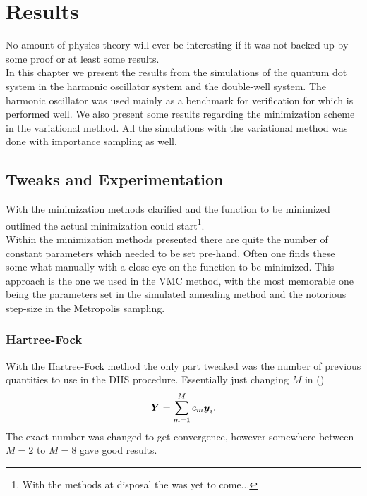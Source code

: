 \chapter{Results \label{chapter:6}}
    No amount of physics theory will ever be interesting if it was not backed
    up by some proof or at least some results. \\
    In this chapter we present the results from the simulations of the quantum
    dot system in the harmonic oscillator system and the double-well system.
    The harmonic oscillator was used mainly as a benchmark for verification for
    which is performed well. We also present some results regarding the
    minimization scheme in the variational method. All the simulations with the
    variational method was done with importance sampling as well.

\section{Tweaks and Experimentation}
    With the minimization methods clarified and the function to be minimized
    outlined the actual minimization could start\footnote{With the methods at
    disposal the  was yet to come...}. \\
    Within the minimization methods presented there are quite the number of
    constant parameters which needed to be set pre-hand. Often one finds these
    some-what manually with a close eye on the function to be minimized. This
    approach is the one we used in the VMC method, with the most memorable one
    being the parameters set in the simulated annealing method and the
    notorious step-size in the Metropolis sampling. 

\subsection{Hartree-Fock}
    With the Hartree-Fock method the only part tweaked was the number of
    previous quantities to use in the DIIS procedure. Essentially just changing
    $M$ in ()
        \begin{equation}
            \blds{Y} = \suml{m=1}{M} c_m\blds{y}_i.
        \end{equation}
    The exact number was changed to get convergence, however somewhere between
    $M=2$ to $M=8$ gave good results.


